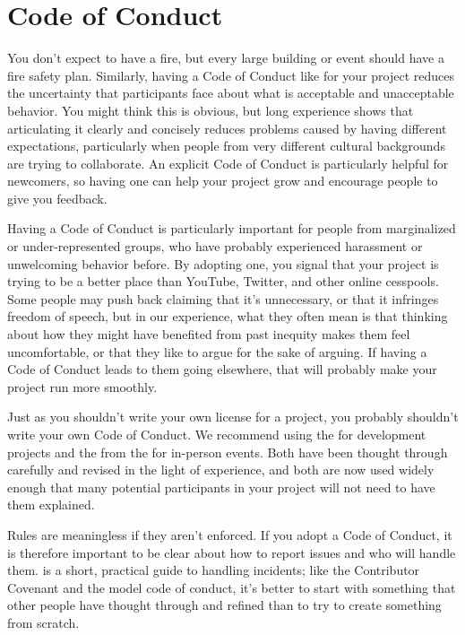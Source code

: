 \section{Code of Conduct}\label{s:collab-conduct}

You don't expect to have a fire,
but every large building or event should have a fire safety plan.
Similarly,
having a Code of Conduct like  for your project
reduces the uncertainty that participants face about what is acceptable and unacceptable behavior.
You might think this is obvious,
but long experience shows that articulating it clearly and concisely reduces problems caused by having different expectations,
particularly when people from very different cultural backgrounds are trying to collaborate.
An explicit Code of Conduct is particularly helpful for newcomers,
so having one can help your project grow
and encourage people to give you feedback.

Having a Code of Conduct is particularly important for people from marginalized or under-represented groups,
who have probably experienced harassment or unwelcoming behavior before.
By adopting one,
you signal that your project is trying to be a better place than YouTube,
Twitter,
and other online cesspools.
Some people may push back claiming that it's unnecessary,
or that it infringes freedom of speech,
but in our experience,
what they often mean is that thinking about how they might have benefited from past inequity makes them feel uncomfortable,
or that they like to argue for the sake of arguing.
If having a Code of Conduct leads to them going elsewhere,
that will probably make your project run more smoothly.

Just as you shouldn't write your own license for a project,
you probably shouldn't write your own Code of Conduct.
We recommend using the  for development projects
and the 
from the  for in-person events.
Both have been thought through carefully and revised in the light of experience,
and both are now used widely enough that
many potential participants in your project will not need to have them explained.

Rules are meaningless if they aren't enforced.
If you adopt a Code of Conduct,
it is therefore important to be clear about how to report issues and who will handle them.
\cite{Auro2018} is a short, practical guide to handling incidents;
like the Contributor Covenant and the model code of conduct,
it's better to start with something that other people have thought through and refined
than to try to create something from scratch.

